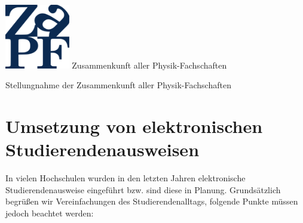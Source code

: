 \documentclass[DIV=calc]{scrartcl}
\begin{document}
\hspace{0.87\textwidth}
\begin{minipage}{120pt}
\vspace{-1.8cm}
\includegraphics[width=80pt]{../../logo.pdf}
\centering
\small Zusammenkunft aller Physik-Fachschaften
\end{minipage}
\begin{center}
\huge{Stellungnahme der Zusammenkunft aller Physik-Fachschaften} \\
\normalsize
\end{center}

\vspace{1cm}
\section*{Umsetzung von elektronischen Studierendenausweisen}

In vielen Hochschulen wurden in den letzten Jahren elektronische Studierendenausweise eingeführt
bzw. sind diese in Planung. Grundsätzlich begrüßen wir Vereinfachungen des Studierendenalltags,
folgende Punkte müssen jedoch beachtet werden:
\end{document}

